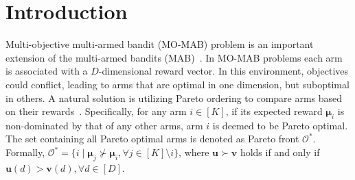 \section{Introduction}
\label{sec: intro}

Multi-objective multi-armed bandit (MO-MAB) problem is an important extension of the multi-armed bandits (MAB)~\cite{drugan2013designing}. In MO-MAB problems each arm is associated with a $D$-dimensional reward vector.
In this environment, objectives could conflict, leading to arms that are optimal in one dimension, but suboptimal in others.
A natural solution is utilizing Pareto ordering to compare arms based on their rewards~\cite{drugan2013designing}. Specifically, for any arm $i \in [K]$, if its expected reward $\boldsymbol{\mu}_i$ is non-dominated by that of any other arms, arm $i$ is deemed to be Pareto optimal. 
The set containing all Pareto optimal arms is denoted as Pareto front $\mathcal{O}^*$.
Formally, $\mathcal{O}^* = \{i \mid \boldsymbol{\mu}_j \not\succ \boldsymbol{\mu}_i, \forall j \in [K]\setminus i \}$, where 
$\boldsymbol{u} \succ \boldsymbol{v}$ holds if and only if $\boldsymbol{u}(d) > \boldsymbol{v}(d), \forall d \in [D]$.
